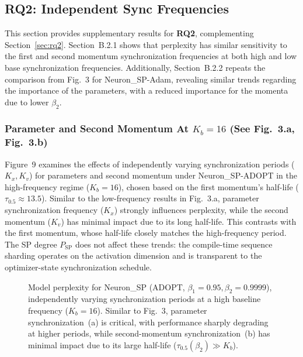 \documentclass{article}
\begin{document}
\subsection{RQ2: Independent Sync Frequencies}
\label{sec:b2_sync_freq}

This section provides supplementary results for \textbf{RQ2}, complementing Section~\ref{sec:rq2}. Section~B.2.1 shows that perplexity has similar sensitivity to the first and second momentum synchronization frequencies at both high and low base synchronization frequencies. Additionally, Section~B.2.2 repeats the comparison from Fig.~3 for Neuron\_SP-Adam, revealing similar trends regarding the importance of the parameters, with a reduced importance for the momenta due to lower $\beta_2$.

\subsubsection{Parameter and Second Momentum At $K_b=16$ (See Fig.~3.a, Fig.~3.b)}
\label{sec:b21_param_second}

Figure~9 examines the effects of independently varying synchronization periods ($K_x, K_v$) for parameters and second momentum under Neuron\_SP-ADOPT in the high-frequency regime ($K_b=16$), chosen based on the first momentum's half-life ($\tau_{0.5}\approx 13.5$). Similar to the low-frequency results in Fig.~3.a, parameter synchronization frequency ($K_x$) strongly influences perplexity, while the second momentum ($K_v$) has minimal impact due to its long half-life. This contrasts with the first momentum, whose half-life closely matches the high-frequency period. The SP degree $P_{\text{SP}}$ does not affect these trends: the compile-time sequence sharding operates on the activation dimension and is transparent to the optimizer-state synchronization schedule.

\begin{figure}[ht]
\centering
\caption{Model perplexity for Neuron\_SP (ADOPT, $\beta_1=0.95, \beta_2=0.9999$), independently varying synchronization periods at a high baseline frequency ($K_b=16$). Similar to Fig.~3, parameter synchronization~(a) is critical, with performance sharply degrading at higher periods, while second-momentum synchronization~(b) has minimal impact due to its large half-life ($\tau_{0.5}(\beta_2)\gg K_b$).}
\label{fig:9}
\end{figure}
\end{document}
